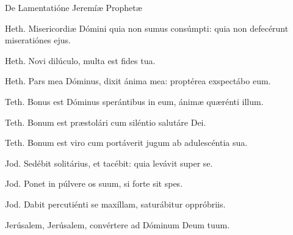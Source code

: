 
De Lamentatióne Jeremíæ Prophetæ

Heth. Misericordiæ Dómini quia non sumus consúmpti: quia non defecérunt miseratiónes ejus.

Heth. Novi dilúculo, multa est fides tua.

Heth. Pars mea Dóminus, dixit ánima mea: proptérea exspectábo eum.

Teth. Bonus est Dóminus sperántibus in eum, ánimæ quærénti illum.

Teth. Bonum est præstolári cum siléntio salutáre Dei.

Teth. Bonum est viro cum portáverit jugum ab adulescéntia sua.

Jod. Sedébit solitárius, et tacébit: quia levávit super se.

Jod. Ponet in púlvere os suum, si forte sit spes.

Jod. Dabit percutiénti se maxíllam, saturábitur oppróbriis.

Jerúsalem, Jerúsalem, convértere ad Dóminum Deum tuum.
\par
